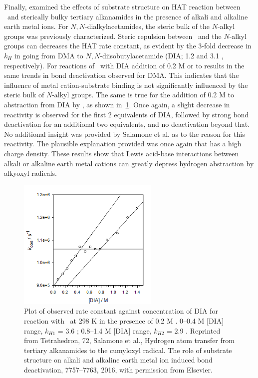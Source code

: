 \begin{doublespace}
Finally, \citet{Salamone2016} examined the effects of substrate structure on HAT
reaction between \cumo\ and sterically bulky tertiary alkanamides in the
presence of alkali and alkaline earth metal ions. For $N,N$-dialkylacetamides,
the steric bulk of the $N$-alkyl groups was previously
characterized.\cite{Salamone2014} Steric repulsion between \cumo\ and the
$N$-alkyl groups can decreases the HAT rate constant, as evident by the 3-fold
decrease in $k_H$ in going from DMA to $N,N$-diisobutylacetamide (DIA; 1.2
and 3.1 \Ms, respectively). For reactions of \cumo\ with DIA addition of
0.2 M  or  to results in the same trends in 
bond deactivation observed for DMA. This indicates that the influence of metal
cation-substrate binding is not significantly influenced by the steric bulk of
$N$-alkyl groups.  The same is true for the addition of 0.2 M  to
abstraction from DIA by \cumo, as shown in~\ref{fig:k-dia-mg}. Once again, a
slight decrease in reactivity is observed for the first 2 equivalents of DIA,
followed by strong  bond deactivation for an additional two equivalents,
and no deactivation beyond that. No additional insight was provided by Salamone
et al. as to the reason for this reactivity. The plausible explanation provided
was once again that  has a high charge density. These results show
that Lewis acid-base interactions between alkali or alkaline earth metal cations
can greatly depress hydrogen abstraction by alkyoxyl radicals.

\begin{figure}[!htbp]
  \includegraphics[width=0.6\textwidth]{figures/exptdia-mg.png}
  \caption[Plot of observed rate constant against concentration of DIA for
  reaction with \cumo\ at 298 K in the presence of 0.2 M .]{Plot
	  of observed rate constant against concentration of DIA for reaction
	  with \cumo\ at 298 K in the presence of 0.2 M . 0--0.4
	  M [DIA] range, $k_{H1}$ = 3.6 \Ms; 0.8--1.4 M [DIA] range,
	  $k_{H2}$ = 2.9 \Ms.  Reprinted from Tetrahedron, 72, Salamone et
  al., Hydrogen atom transfer from tertiary alkanamides to the cumyloxyl
  radical. The role of substrate structure on alkali and alkaline earth metal
  ion induced  bond deactivation, 7757--7763, 2016, with permission
  from Elsevier.} \label{fig:k-dia-mg}
\end{figure}


\end{doublespace}
